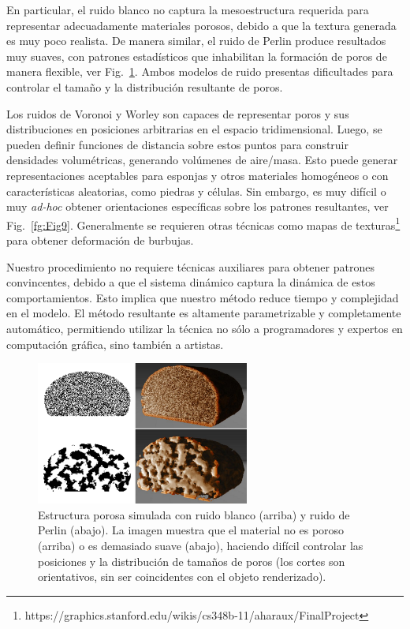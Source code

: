 En particular, el ruido blanco no captura la mesoestructura requerida para representar adecuadamente materiales porosos, debido a que la textura generada es muy poco realista.
De manera similar, el ruido de Perlin produce resultados muy suaves, con patrones estadísticos que inhabilitan la formación de poros de manera flexible, ver Fig.~\ref{fg:Fig8}.
Ambos modelos de ruido presentas dificultades para controlar el tamaño y la distribución resultante de poros.

Los ruidos de Voronoi y Worley son capaces de representar poros y sus distribuciones en posiciones arbitrarias en el espacio tridimensional.
Luego, se pueden definir funciones de distancia sobre estos puntos para construir densidades volumétricas, generando volúmenes de aire/masa.
Esto puede generar representaciones aceptables para esponjas y otros materiales homogéneos o con características aleatorias, como piedras y células.
Sin embargo, es muy difícil o muy {\em ad-hoc} obtener orientaciones específicas sobre los patrones resultantes, ver Fig.~\ref{fg:Fig9}.
Generalmente se requieren otras técnicas como mapas de texturas\footnote{https://graphics.stanford.edu/wikis/cs348b-11/aharaux/FinalProject} para obtener deformación de burbujas.

Nuestro procedimiento no requiere técnicas auxiliares para obtener patrones convincentes, debido a que el sistema dinámico captura la dinámica de estos comportamientos.
Esto implica que nuestro método reduce tiempo y complejidad en el modelo.
El método resultante es altamente parametrizable y completamente automático, permitiendo utilizar la técnica no sólo a programadores y expertos en computación gráfica, sino también a artistas.


\begin{figure}
  \centerline{\includegraphics[width=7cm]{figures/Fig8}}
  \caption[Estructura porosa simulada con ruido blanco y ruido de Perlin]{Estructura porosa simulada con ruido blanco (arriba) y ruido de Perlin (abajo). La imagen muestra que el material no es poroso (arriba) o es demasiado suave (abajo), haciendo difícil controlar las posiciones y la distribución de tamaños de poros (los cortes son orientativos, sin ser coincidentes con el objeto renderizado).}
  \label{fg:Fig8}
\end{figure}

